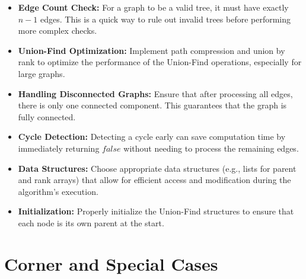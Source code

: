 \begin{itemize}
    \item \textbf{Edge Count Check:} For a graph to be a valid tree, it must have exactly \( n - 1 \) edges. This is a quick way to rule out invalid trees before performing more complex checks.
    
    \item \textbf{Union-Find Optimization:} Implement path compression and union by rank to optimize the performance of the Union-Find operations, especially for large graphs.
    
    \item \textbf{Handling Disconnected Graphs:} Ensure that after processing all edges, there is only one connected component. This guarantees that the graph is fully connected.
    
    \item \textbf{Cycle Detection:} Detecting a cycle early can save computation time by immediately returning \( false \) without needing to process the remaining edges.
    
    \item \textbf{Data Structures:} Choose appropriate data structures (e.g., lists for parent and rank arrays) that allow for efficient access and modification during the algorithm's execution.
    
    \item \textbf{Initialization:} Properly initialize the Union-Find structures to ensure that each node is its own parent at the start.
\end{itemize}

\section*{Corner and Special Cases}

